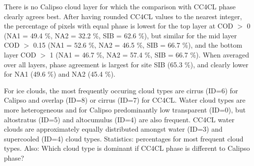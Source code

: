 There is no Calipso cloud layer for which the comparison with CC4CL phase clearly agrees best. After having rounded CC4CL values to the nearest integer, the percentage of pixels with equal phase is lowest for the top layer at COD $>$ 0 (NA1 = 49.4 \%, NA2 = 32.2 \%, SIB = 62.6 \%), but similar for the mid layer COD $>$ 0.15 (NA1 = 52.6 \%, NA2 = 46.5 \%, SIB = 66.7 \%), and the bottom layer COD $>$ 1 (NA1 = 46.7 \%, NA2 = 57.4 \%, SIB = 66.7 \%). When averaged over all layers, phase agreement is largest for site SIB (65.3 \%), and clearly lower for NA1 (49.6 \%) and NA2 (45.4 \%).

For ice clouds, the most frequently occuring cloud types are cirrus (ID=6) for Calipso and overlap (ID=8) or cirrus (ID=7) for CC4CL. Water cloud types are more heterogeneous and for Calipso predominantly low transparent (ID=0), but altostratus (ID=5) and altocumulus (ID=4) are also frequent. CC4CL water clouds are approximately equally distributed amongst water (ID=3) and supercooled (ID=4) cloud types. Statistics: percentages for most frequent cloud types. Also: Which cloud type is dominant if CC4CL phase is different to Calipso phase?

